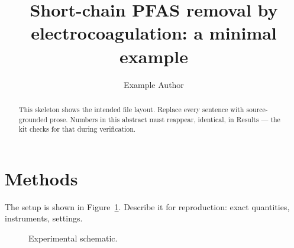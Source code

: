 \documentclass[11pt]{article}
\title{Short-chain PFAS removal by electrocoagulation: a minimal example}
\author{Example Author}
\begin{document}
\maketitle

\begin{abstract}
This skeleton shows the intended file layout. Replace every sentence with
source-grounded prose. Numbers in this abstract must reappear, identical, in
Results --- the kit checks for that during verification.
\end{abstract}



\section{Methods}
The setup is shown in Figure~\ref{fig:setup}. Describe it for reproduction:
exact quantities, instruments, settings.

\begin{figure}[t]
  \centering
  \caption{Experimental schematic.}
  \label{fig:setup}
\end{figure}



\end{document}
